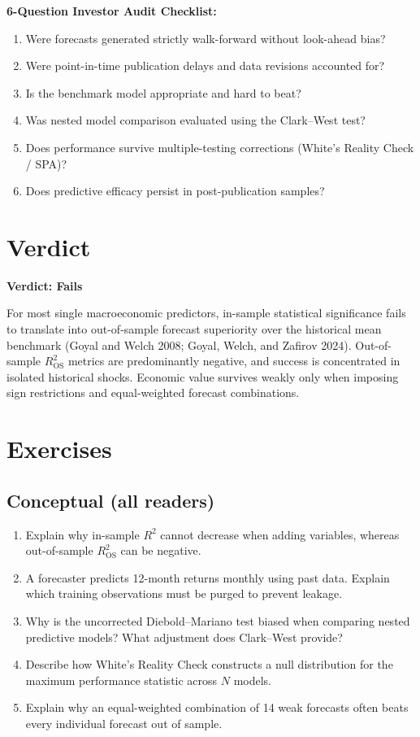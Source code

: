 \textbf{6-Question Investor Audit Checklist:}
\begin{enumerate}
  \item Were forecasts generated strictly walk-forward without look-ahead bias?
  \item Were point-in-time publication delays and data revisions accounted for?
  \item Is the benchmark model appropriate and hard to beat?
  \item Was nested model comparison evaluated using the Clark--West test?
  \item Does performance survive multiple-testing corrections (White's Reality Check / SPA)?
  \item Does predictive efficacy persist in post-publication samples?
\end{enumerate}

\section{Verdict}
\label{sec:05-verdict}

\begin{callout}
\noindent \textbf{Verdict: Fails}

For most single macroeconomic predictors, in-sample statistical significance fails to translate into out-of-sample forecast superiority over the historical mean benchmark (Goyal and Welch 2008; Goyal, Welch, and Zafirov 2024). Out-of-sample $R^2_{\text{OS}}$ metrics are predominantly negative, and success is concentrated in isolated historical shocks. Economic value survives weakly only when imposing sign restrictions and equal-weighted forecast combinations.
\end{callout}

\section*{Exercises}

\subsection*{Conceptual (all readers)}
\begin{enumerate}
  \item Explain why in-sample $R^2$ cannot decrease when adding variables, whereas out-of-sample $R^2_{\text{OS}}$ can be negative.
  \item A forecaster predicts 12-month returns monthly using past data. Explain which training observations must be purged to prevent leakage.
  \item Why is the uncorrected Diebold--Mariano test biased when comparing nested predictive models? What adjustment does Clark--West provide?
  \item Describe how White's Reality Check constructs a null distribution for the maximum performance statistic across $N$ models.
  \item Explain why an equal-weighted combination of 14 weak forecasts often beats every individual forecast out of sample.
\end{enumerate}

